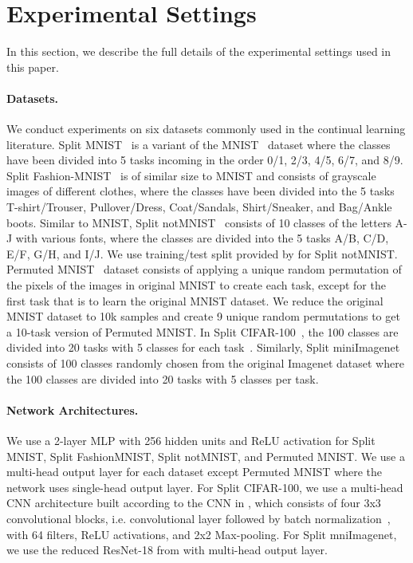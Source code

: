 
\section{Experimental Settings}\label{paperC:app:experimental_settings}

In this section, we describe the full details of the experimental settings used in this paper. 

\vspace{-3mm}
\paragraph{Datasets.}
We conduct experiments on six datasets commonly used in the continual learning literature. Split MNIST~ is a variant of the MNIST~ dataset where the classes have been divided into 5 tasks incoming in the order 0/1, 2/3, 4/5, 6/7, and 8/9. Split Fashion-MNIST~ is of similar size to MNIST and consists of grayscale images of different clothes, where the classes have been divided into the 5 tasks T-shirt/Trouser, Pullover/Dress, Coat/Sandals, Shirt/Sneaker, and Bag/Ankle boots. Similar to MNIST, Split notMNIST~ consists of 10 classes of the letters A-J with various fonts, where the classes are divided into the 5 tasks A/B, C/D, E/F, G/H, and I/J. We use training/test split provided by  for Split notMNIST. Permuted MNIST~ dataset consists of applying a unique random permutation of the pixels of the images in original MNIST to create each task, except for the first task that is to learn the original MNIST dataset. We reduce the original MNIST dataset to 10k samples and create 9 unique random permutations to get a 10-task version of Permuted MNIST. In Split CIFAR-100~, the 100 classes are divided into 20 tasks with 5 classes for each task~. Similarly, Split miniImagenet~ consists of 100 classes randomly chosen from the original Imagenet dataset where the 100 classes are divided into 20 tasks with 5 classes per task.

\vspace{-3mm}
\paragraph{Network Architectures.} We use a 2-layer MLP with 256 hidden units and ReLU activation for Split MNIST, Split FashionMNIST, Split notMNIST, and Permuted MNIST. We use a multi-head output layer for each dataset except Permuted MNIST where the network uses single-head output layer. For Split CIFAR-100, we use a multi-head CNN architecture built according to the CNN in , which consists of four 3x3 convolutional blocks, i.e. convolutional layer followed by batch normalization~, with 64 filters, ReLU activations, and 2x2 Max-pooling. For Split mniImagenet, we use the reduced ResNet-18 from  with multi-head output layer. 

